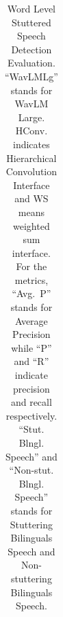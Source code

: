 \begin{table}
\begin{tabular}{lccccccccccc}

\bottomrule
\end{tabular}
\caption{Word Level Stuttered Speech Detection Evaluation. ``WavLMLg'' stands for WavLM Large.
HConv. indicates Hierarchical Convolution Interface and WS means weighted sum interface. For the metrics, ``Avg.~P'' stands for Average Precision while ``P'' and ``R'' indicate precision and recall respectively.
``Stut. Blngl. Speech'' and ``Non-stut. Blngl. Speech'' stands for Stuttering Bilinguals Speech and Non-stuttering Bilinguals Speech.
}
\label{tab:Word_level}
\vspace{-10pt}
\end{table}